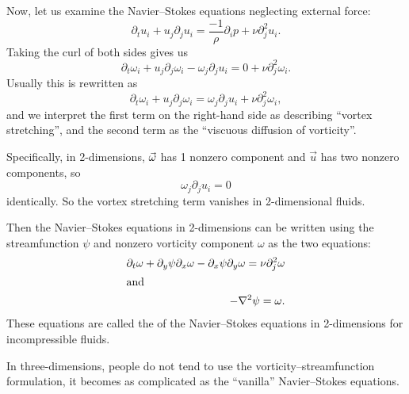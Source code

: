 \begin{node}
Now, let us examine the Navier--Stokes equations neglecting external
force:
\begin{equation}
\partial_{t}u_{i}+u_{j}\partial_{j}u_{i}=\frac{-1}{\rho}\partial_{i}p+\nu\partial_{j}^{2}u_{i}.
\end{equation}
Taking the curl of both sides gives us
\begin{equation}
\partial_{t}\omega_{i}+u_{j}\partial_{j}\omega_{i}-\omega_{j}\partial_{j}u_{i}=0+\nu\partial_{j}^{2}\omega_{i}.
\end{equation}
Usually this is rewritten as
\begin{equation}
\partial_{t}\omega_{i}+u_{j}\partial_{j}\omega_{i}=\omega_{j}\partial_{j}u_{i}+\nu\partial_{j}^{2}\omega_{i},
\end{equation}
and we interpret the first term on the right-hand side as describing
``vortex stretching'', and the second term as the ``viscuous diffusion
of vorticity''.
\end{node}

\begin{node}
Specifically, in 2-dimensions, $\vec{\omega}$ has 1 nonzero component
and $\vec{u}$ has two nonzero components, so
\begin{equation}
\omega_{j}\partial_{j}u_{i}=0
\end{equation}
identically. So the vortex stretching term vanishes in 2-dimensional fluids.
\end{node}

\begin{node}
Then the Navier--Stokes equations in 2-dimensions can be written using
the streamfunction $\psi$ and nonzero vorticity component $\omega$ as
the two equations:
\begin{subequations}
  \begin{align}
\partial_{t}\omega+\partial_{y}\psi\partial_{x}\omega-\partial_{x}\psi\partial_{y}\omega=\nu\partial_{j}^{2}\omega\\
\intertext{and}
-\nabla^{2}\psi=\omega.
  \end{align}
\end{subequations}
These equations are called the 
of the Navier--Stokes equations in 2-dimensions for incompressible fluids.
\end{node}

\begin{remark}
In three-dimensions, people do not tend to use the
vorticity--streamfunction formulation, it becomes as complicated as
the ``vanilla'' Navier--Stokes equations.
\end{remark}

